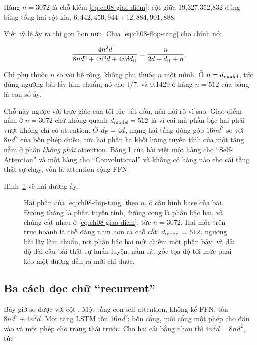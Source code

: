 Hàng \(n = 3072\) là chỗ kiểm \eqref{eq:ch08-giao-diem}: cột giữa 19{,}327{,}352{,}832
đúng bằng tổng hai cột kia, \(6{,}442{,}450{,}944 + 12{,}884{,}901{,}888\).

Viết tỷ lệ ấy ra thì gọn hơn nữa. Chia \eqref{eq:ch08-flop-tang} cho chính nó:

\begin{equation}
  \frac{4n^2 d}{8nd^2 + 4n^2 d + 4ndd_{\mathrm{ff}}}
  = \frac{n}{2d + d_{\mathrm{ff}} + n} .
  \label{eq:ch08-ty-le}
\end{equation}

Chỉ phụ thuộc \(n\) so với bề rộng, không phụ thuộc \(n\) một mình. Ở
\(n = d_{\mathrm{model}}\), tức đúng ngưỡng bài lấy làm chuẩn, nó cho \(1/7\), và
0.1429 ở hàng \(n = 512\) của bảng là con số ấy.

%
Chỗ này ngược với trực giác của tôi lúc bắt đầu, nên nói rõ vì sao. Giao điểm
nằm ở \(n = 3072\) chứ không quanh \(d_{\mathrm{model}} = 512\) là vì cái mà phần bậc hai
phải vượt không chỉ có attention. Ở \(d_{\mathrm{ff}} = 4d\), mạng hai tầng đóng góp
\(16nd^2\) so với \(8nd^2\) của bốn phép chiếu, tức hai phần ba khối lượng tuyến
tính của một tầng nằm ở phần \emph{không phải} attention. Bảng 1 của bài viết
một hàng cho \enquote{Self-Attention} và một hàng cho \enquote{Convolutional} và
không có hàng nào cho cái tầng thật sự chạy, vốn là attention cộng FFN.

Hình~\ref{fig:ch08-chi-phi} vẽ hai đường ấy.

\begin{figure}[htbp]
  \centering
  
  \caption{Hai phần của \eqref{eq:ch08-flop-tang} theo \(n\), ở cấu hình base
    của bài. Đường thẳng là phần tuyến tính, đường cong là phần bậc hai, và
    chúng cắt nhau ở \eqref{eq:ch08-giao-diem}, tức \(n = 3072\). Hai mốc trên
    trục hoành là chỗ đáng nhìn hơn cả chỗ cắt: \(d_{\mathrm{model}} = 512\), ngưỡng bài
    lấy làm chuẩn, nơi phần bậc hai mới chiếm một phần bảy; và dải độ dài câu
    bài thật sự huấn luyện, nằm sát gốc tọa độ tới mức phải kéo một đường dẫn ra
    mới chỉ được.}
  \label{fig:ch08-chi-phi}
\end{figure}

\subsection*{Ba cách đọc chữ \enquote{recurrent}}

%
Bây giờ so được với cột . Một tầng con self-attention, không kể
FFN, tốn \(8nd^2 + 4n^2d\). Một tầng LSTM tốn \(16nd^2\): bốn cổng, mỗi cổng một
phép cho đầu vào và một phép cho trạng thái trước. Cho hai cái bằng nhau thì
\(4n^2d = 8nd^2\), tức

